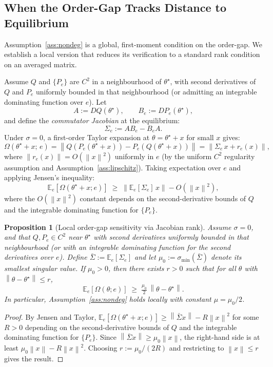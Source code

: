\documentclass[12pt,a4paper]{article}
\newtheorem{proposition}[definition]{Proposition}
\newcommand{\norm}[1]{\left\lVert#1\right\rVert}
\newcommand{\Ogap}{\Omega}
\begin{document}
\subsection{When the Order-Gap Tracks Distance to Equilibrium}
\label{sec:local_nondeg}

Assumption~\ref{ass:nondeg} is a global, first-moment condition on the
order-gap. We establish a local version that reduces its verification to a
standard rank condition on an averaged matrix.

Assume $Q$ and $\{P_e\}$ are $C^2$ in a neighbourhood of $\theta^\star$, with
second derivatives of $Q$ and $P_e$ uniformly bounded in that neighbourhood
(or admitting an integrable dominating function over $e$). Let
\[
  A := DQ(\theta^\star), \qquad B_e := DP_e(\theta^\star),
\]
and define the \emph{commutator Jacobian} at the equilibrium:
\[
  \Sigma_e := A B_e - B_e A.
\]
Under $\sigma = 0$, a first-order Taylor expansion at
$\theta = \theta^\star + x$ for small $x$ gives:
\[
  \Ogap(\theta^\star + x;\, e)
    = \norm{Q(P_e(\theta^\star + x)) - P_e(Q(\theta^\star + x))}
    = \norm{\Sigma_e\, x + r_e(x)},
\]
where $\norm{r_e(x)} = O(\norm{x}^2)$ uniformly in $e$ (by the uniform
$C^2$ regularity assumption and Assumption~\ref{ass:lipschitz}). Taking
expectation over $e$ and applying Jensen's inequality:
\[
  \mathbb{E}_e[\Ogap(\theta^\star + x; e)]
    \;\geq\; \norm{\mathbb{E}_e[\Sigma_e] \, x} - O(\norm{x}^2),
\]
where the $O(\norm{x}^2)$ constant depends on the second-derivative bounds
of $Q$ and the integrable dominating function for $\{P_e\}$.

\begin{proposition}[Local order-gap sensitivity via Jacobian rank]
\label{prop:local_nondeg}
Assume $\sigma = 0$, and that $Q, P_e \in C^2$ near $\theta^\star$ with
second derivatives uniformly bounded in that neighbourhood (or with an
integrable dominating function for the second derivatives over $e$). Define
$\bar\Sigma := \mathbb{E}_e[\Sigma_e]$ and let
$\mu_0 := \sigma_{\min}(\bar\Sigma)$ denote its smallest singular value.
If $\mu_0 > 0$, then there exists $r > 0$ such that for all $\theta$ with
$\norm{\theta - \theta^\star} \leq r$,
\[
  \mathbb{E}_e[\Ogap(\theta; e)] \;\geq\; \tfrac{\mu_0}{2} \, \norm{\theta - \theta^\star}.
\]
In particular, Assumption~\ref{ass:nondeg} holds locally with constant
$\mu = \mu_0 / 2$.
\end{proposition}

\begin{proof}
By Jensen and Taylor,
$\mathbb{E}_e[\Ogap(\theta^\star + x; e)]
\geq \norm{\bar\Sigma x} - R \norm{x}^2$
for some $R > 0$ depending on the second-derivative bounds of $Q$ and the
integrable dominating function for $\{P_e\}$. Since $\norm{\bar\Sigma x} \geq \mu_0
\norm{x}$, the right-hand side is at least $\mu_0 \norm{x} - R \norm{x}^2$.
Choosing $r := \mu_0 / (2R)$ and restricting to $\norm{x} \leq r$ gives
the result. \qedhere
\end{proof}
\end{document}
